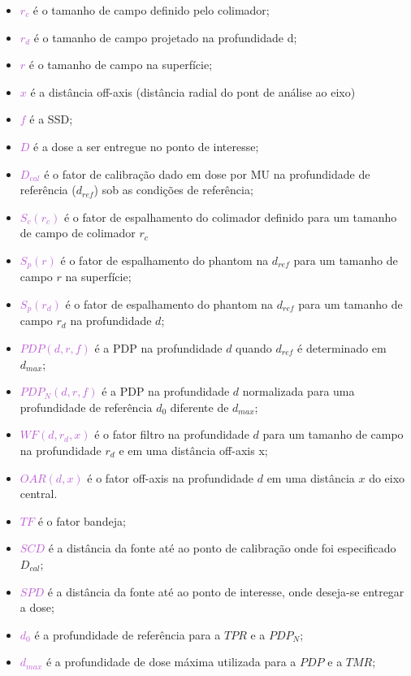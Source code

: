\documentclass[11pt,a4paper]{article}
\newcounter{exemplo}
\begin{document}
    \begin{exemplo}[onde:]
        \begin{itemize}
            \item \textcolor{MediumOrchid}{$r_c$} é o tamanho de campo definido pelo colimador;
            \item \textcolor{MediumOrchid}{$r_d$} é o tamanho de campo projetado na profundidade d;
            \item \textcolor{MediumOrchid}{$r$} é o tamanho de campo na superfície;
            \item \textcolor{MediumOrchid}{$x$} é a distância off-axis (distância radial do pont de análise ao eixo)
            \item \textcolor{MediumOrchid}{$f$} é a SSD;
            \item \textcolor{MediumOrchid}{$D$} é a dose a ser entregue no ponto de interesse;
            \item \textcolor{MediumOrchid}{$D_{cal}$} é o fator de calibração dado em dose por MU na profundidade de referência ($d_{ref}$) sob as condições de referência;
            \item \textcolor{MediumOrchid}{$S_c(r_c)$} é o fator de espalhamento do colimador definido para um tamanho de campo de colimador $r_c$
            \item \textcolor{MediumOrchid}{$S_p(r)$} é o fator de espalhamento do phantom na $d_{ref}$ para um tamanho de campo $r$ na superfície;
            \item \textcolor{MediumOrchid}{$S_p(r_d)$} é o fator de espalhamento do phantom na $d_{ref}$ para um tamanho de campo $r_d$ na profundidade $d$;
            \item \textcolor{MediumOrchid}{$PDP(d, r, f)$} é a PDP  na profundidade $d$ quando $d_{ref}$ é determinado em $d_{max}$;
            \item \textcolor{MediumOrchid}{$PDP_N(d, r, f)$} é a PDP na profundidade $d$ normalizada para uma profundidade de referência $d_{0}$ diferente de $d_{max}$;
            \item \textcolor{MediumOrchid}{$WF(d, r_d, x)$} é o fator filtro na profundidade $d$ para um tamanho de campo na profundidade $r_d$ e em uma distância off-axis x;
            \item \textcolor{MediumOrchid}{$OAR(d, x)$} é o fator off-axis na profundidade $d$ em uma distância $x$ do eixo central.
            \item \textcolor{MediumOrchid}{$TF$} é o fator bandeja;
            \item \textcolor{MediumOrchid}{$SCD$} é a distância da fonte até ao ponto de calibração onde foi especificado $D_{cal}$;
            \item \textcolor{MediumOrchid}{$SPD$} é a distância da fonte até ao ponto de interesse, onde deseja-se entregar a dose;
            \item \textcolor{MediumOrchid}{$d_{0}$} é a profundidade de referência para a $TPR$ e a $PDP_N$;
            \item \textcolor{MediumOrchid}{$d_{max}$} é a profundidade de dose máxima utilizada para a $PDP$ e a $TMR$;
        \end{itemize}
    \end{exemplo}
\end{document}
